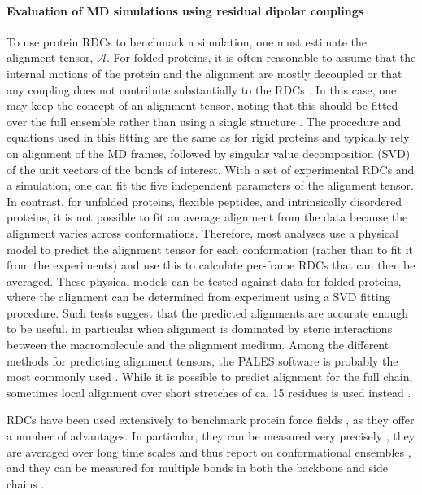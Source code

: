 \documentclass[9pt,review]{livecoms}
\begin{document}
\paragraph{Evaluation of MD simulations using residual dipolar couplings}

To use protein RDCs to benchmark a simulation, one must estimate the alignment tensor, $\mathcal{A}$.
For folded proteins, it is often reasonable to assume that the internal motions of the protein and the alignment are mostly decoupled or that any coupling does not contribute substantially to the RDCs \cite{louhivuori2006conformational,salvatella2008influence}.
In this case, one may keep the concept of an alignment tensor, noting that this should be fitted over the full ensemble rather than using a single structure \cite{lindorff2005simultaneous,showalter2007quantitative}.
The procedure and equations used in this fitting are the same as for rigid proteins and typically rely on alignment of the MD frames, followed by singular value decomposition (SVD) of the unit vectors of the bonds of interest.
With a set of experimental RDCs and a simulation, one can fit the five independent parameters of the alignment tensor.
In contrast, for unfolded proteins, flexible peptides, and intrinsically disordered proteins, it is not possible to fit an average alignment from the data because the alignment varies across conformations.
Therefore, most analyses use a physical model to predict the alignment tensor for each conformation (rather than to fit it from the experiments) and use this to calculate per-frame RDCs that can then be averaged.
These physical models can be tested against data for folded proteins, where the alignment can be determined from experiment using a SVD fitting procedure.
Such tests suggest that the predicted alignments are accurate enough to be useful, in particular when alignment is dominated by steric interactions between the macromolecule and the alignment medium.
Among the different methods for predicting alignment tensors, the PALES software is probably the most commonly used \cite{zweckstetter_nmr_2008}.
While it is possible to predict alignment for the full chain, sometimes local alignment over short stretches of ca. 15 residues is used instead \cite{marsh2008calculation}.

RDCs have been used extensively to benchmark protein force fields \cite{lange2010scrutinizing,lindorff-larsen_improved_2010,lindorff2012systematic,robustelli_developing_2018}, as they offer a number of advantages.
In particular, they can be measured very precisely \cite{chiliveri2021advances}, they are averaged over long time scales and thus report on conformational ensembles \cite{lakomek2008self}, and they can be measured for multiple bonds in both the backbone and side chains \cite{chiliveri2021advances}.
\end{document}
